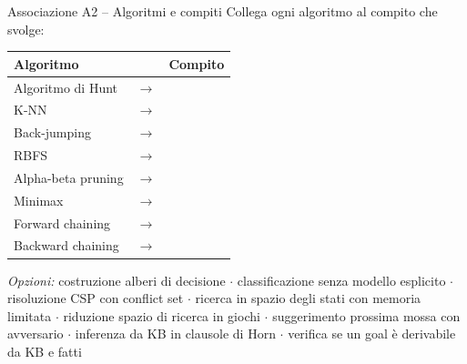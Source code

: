 \documentclass[12pt,a4paper]{article}
\begin{document}
\begin{assocbox}{Associazione A2 -- Algoritmi e compiti}
Collega ogni algoritmo al compito che svolge:

\begin{center}
\renewcommand{\arraystretch}{1.5}
\begin{tabular}{lll}
\textbf{Algoritmo} & & \textbf{Compito} \\
\hline
Algoritmo di Hunt & $\longrightarrow$ & \underline{\hspace{5cm}} \\
K-NN & $\longrightarrow$ & \underline{\hspace{5cm}} \\
Back-jumping & $\longrightarrow$ & \underline{\hspace{5cm}} \\
RBFS & $\longrightarrow$ & \underline{\hspace{5cm}} \\
Alpha-beta pruning & $\longrightarrow$ & \underline{\hspace{5cm}} \\
Minimax & $\longrightarrow$ & \underline{\hspace{5cm}} \\
Forward chaining & $\longrightarrow$ & \underline{\hspace{5cm}} \\
Backward chaining & $\longrightarrow$ & \underline{\hspace{5cm}} \\
\end{tabular}
\end{center}

\smallskip
\textit{Opzioni:} costruzione alberi di decisione $\cdot$ classificazione senza modello esplicito $\cdot$ risoluzione CSP con conflict set $\cdot$ ricerca in spazio degli stati con memoria limitata $\cdot$ riduzione spazio di ricerca in giochi $\cdot$ suggerimento prossima mossa con avversario $\cdot$ inferenza da KB in clausole di Horn $\cdot$ verifica se un goal è derivabile da KB e fatti
\end{assocbox}
\end{document}
